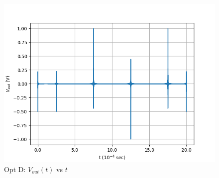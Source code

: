 \documentclass[journal,12pt,twocolumn]{IEEEtran}
\theoremstyle{remark}
\begin{document}
\begin{enumerate}
\begin{figure}[!h]
        \includegraphics[width = \columnwidth]{figs/opt_d_res.png}
        \caption{Opt D: $V_{out}(t)$ vs $t$}
        \label{fig:opt_d_res_gate.23.ph.37}
    \end{figure}
\end{enumerate}
\end{document}
